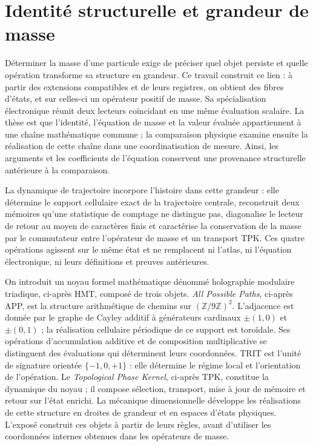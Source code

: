\section{Identité structurelle et grandeur de masse
}
\label{vi:sec:introduccion}

Déterminer la masse d’une particule exige de préciser quel objet persiste et
quelle opération transforme sa structure en grandeur. Ce travail
construit ce lien : à partir des extensions compatibles et de leurs registres, on
obtient des fibres d’états, et sur celles-ci un opérateur positif de masse.
Sa spécialisation électronique réunit deux lecteurs coïncidant en une
même évaluation scalaire. La thèse est que l’identité, l’équation de
masse et la valeur évaluée appartiennent à une chaîne mathématique commune ; la
comparaison physique examine ensuite la réalisation de cette chaîne dans une
coordinatisation de mesure. Ainsi, les arguments et les coefficients de l’équation
conservent une provenance structurelle antérieure à la comparaison.


La dynamique de trajectoire incorpore l’histoire dans cette grandeur : elle détermine
le support cellulaire exact de la trajectoire centrale, reconstruit deux mémoires
qu’une statistique de comptage ne distingue pas, diagonalise le lecteur de retour
au moyen de caractères finis et caractérise la conservation de la masse par le
commutateur entre l’opérateur de masse et un transport TPK. Ces quatre
opérations agissent sur le même état et ne remplacent ni l’atlas, ni l’équation
électronique, ni leurs définitions et preuves antérieures.


On introduit un noyau formel mathématique dénommé holographie modulaire
triadique, ci-après HMT, composé de trois objets. \emph{All Possible
Paths}, ci-après APP, est la structure arithmétique de chemins sur
\((\mathbb Z/9\mathbb Z)^2\). L’adjacence est donnée par le graphe de
Cayley additif à générateurs cardinaux \(\pm(1,0)\) et \(\pm(0,1)\) ;
la réalisation cellulaire périodique de ce support est toroïdale. Ses
opérations d’accumulation additive et de composition
multiplicative se distinguent des évaluations qui déterminent leurs
coordonnées. TRIT est l’unité de signature orientée \(\{-1,0,+1\}\) :
elle détermine le régime local et l’orientation de l’opération. Le
\emph{Topological Phase Kernel}, ci-après TPK, constitue la dynamique
du noyau ; il compose sélection, transport, mise à jour de mémoire et
retour sur l’état enrichi. La mécanique dimensionnelle développe
les réalisations de cette structure en droites de grandeur et en espaces
d’états physiques. L’exposé construit ces objets à partir de leurs règles,
avant d’utiliser les coordonnées internes obtenues dans les opérateurs de masse.


